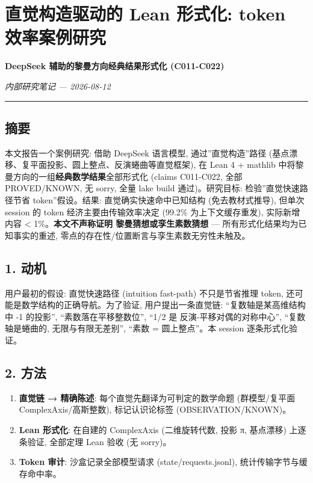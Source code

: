 \documentclass[
]{article}
\author{}
\date{}
\providecommand{\tightlist}{%
  \setlength{\itemsep}{0pt}\setlength{\parskip}{0pt}}
\begin{document}
\section{直觉构造驱动的 Lean 形式化: token
效率案例研究}\label{ux76f4ux89c9ux6784ux9020ux9a71ux52a8ux7684-lean-ux5f62ux5f0fux5316-token-ux6548ux7387ux6848ux4f8bux7814ux7a76}

\textbf{DeepSeek 辅助的黎曼方向经典结果形式化 (C011-C022)}

\emph{内部研究笔记 --- 2026-08-12}

\begin{center}\rule{0.5\linewidth}{0.5pt}\end{center}

\subsection{摘要}\label{ux6458ux8981}

本文报告一个案例研究: 借助 DeepSeek 语言模型, 通过''直觉构造''路径
(基点漂移、复平面投影、圆上整点、反演蜷曲等直觉框架), 在 Lean 4 +
mathlib 中将黎曼方向的一组\textbf{经典数学结果}全部形式化 (claims
C011-C022, 全部 PROVED/KNOWN, 无 sorry, 全量 lake build 通过)。研究目标:
检验''直觉快速路径节省 token''假设。结果: 直觉确实快速命中已知结构
(免去教材式推导), 但单次 session 的 token 经济主要由传输效率决定 (99.2\%
为上下文缓存重发), 实际新增内容 \textless{} 1\%。\textbf{本文不声称证明
黎曼猜想或孪生素数猜想} --- 所有形式化结果均为已知事实的重述,
零点的存在性/位置断言与孪生素数无穷性未触及。

\subsection{1. 动机}\label{ux52a8ux673a}

用户最初的假设: 直觉快速路径 (intuition fast-path) 不只是节省推理 token,
还可能是数学结构的正确导航。为了验证, 用户提出一条直觉链:
``复数轴是某高维结构中 -1 的投影'', ``素数落在平移整数位'', ``1/2 是
反演-平移对偶的对称中心'', ``复数轴是蜷曲的, 无限与有限无差别'', ``素数
= 圆上整点''。本 session 逐条形式化验证。

\subsection{2. 方法}\label{ux65b9ux6cd5}

\begin{enumerate}
\def\labelenumi{\arabic{enumi}.}
\tightlist
\item
  \textbf{直觉链 → 精确陈述}: 每个直觉先翻译为可判定的数学命题
  (群模型/复平面 ComplexAxis/高斯整数), 标记认识论标签
  (OBSERVATION/KNOWN)。
\item
  \textbf{Lean 形式化}: 在自建的 ComplexAxis (二维旋转代数, 投影 π,
  基点漂移) 上逐条验证, 全部定理 Lean 验收 (无 sorry)。
\item
  \textbf{Token 审计}: 沙盒记录全部模型请求 (state/requests.jsonl),
  统计传输字节与缓存命中率。
\end{enumerate}
\end{document}
